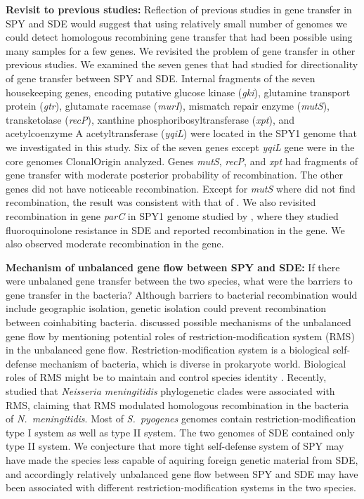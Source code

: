 \documentclass[english]{article}
\begin{document}
\textbf{Revisit to previous studies:} 
Reflection of previous studies in gene transfer in SPY and SDE would suggest
that using relatively small number of genomes we could detect homologous
recombining gene transfer that had been possible using many samples for
a few genes. We revisited the problem of gene transfer in other previous
studies.  We examined
the seven genes that \citet{Kalia2001} had studied for directionality
of gene transfer between SPY and SDE. Internal fragments of the seven
housekeeping genes, encoding putative glucose kinase (\emph{gki}),
glutamine transport protein (\emph{gtr}), glutamate racemase (\emph{murI}),
mismatch repair enzyme (\emph{mutS}), transketolase (\emph{recP}),
xanthine phosphoribosyltransferase (\emph{xpt}), and acetylcoenzyme
A acetyltransferase (\emph{yqiL}) were located in the SPY1 genome that we
investigated in this study.  Six of the seven genes except \emph{yqiL
}gene were in the core genomes ClonalOrigin analyzed. Genes \emph{mutS},
\emph{recP}, and \emph{xpt} had fragments of gene transfer with moderate
posterior probability of recombination. The other genes did not have
noticeable recombination. Except for \emph{mutS} where \citet{Kalia2001}
did not find recombination, the result was consistent with that of
\citet{Kalia2001}. 
We also revisited recombination in gene \emph{parC} in SPY1 genome
studied by \citet{Pinho2010}, where they studied fluoroquinolone
resistance in SDE and reported recombination in the gene. We also
observed moderate recombination in the gene. 

\textbf{Mechanism of unbalanced gene flow between SPY and SDE:} 
If there were unbalaned gene transfer between the two
species, what were the barriers \citep{Thomas2005} to gene transfer
in the bacteria? Although barriers to bacterial recombination would
include geographic isolation, genetic isolation could prevent recombination
between coinhabiting bacteria. \citet{Kalia2001} discussed possible
mechanisms of the unbalanced gene flow by mentioning potential roles
of restriction-modification system (RMS) in the unbalanced gene flow.
Restriction-modification system is a biological self-defense mechanism
of bacteria, which is diverse in prokaryote world. Biological roles
of RMS might be to maintain and control species identity \citep{Jeltsch2003}.
Recently, \citet{Budroni2011a} studied that \emph{Neisseria meningitidis}
phylogenetic clades were associated with RMS, claiming that RMS modulated
homologous recombination in the bacteria of \emph{N.\ meningitidis}.
Most of \emph{S.\ pyogenes} genomes contain restriction-modification
type I system as well as type II system. The two genomes of SDE contained
only type II system. We conjecture that more tight self-defense system
of SPY may have made the species less capable of aquiring foreign
genetic material from SDE, and accordingly relatively unbalanced gene
flow between SPY and SDE may have been associated with different 
restriction-modification systems in the two species.
\end{document}
